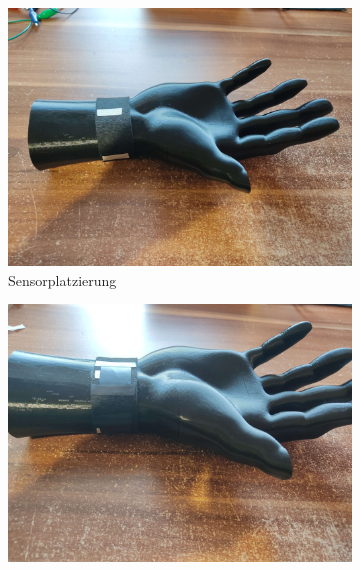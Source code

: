 \documentclass[11pt, a4paper]{article}
\begin{document}
\begin{figure}[h]
	\begin{subfigure}[c]{0.33\textwidth}
		\includegraphics[scale=.037]{assets/Strap_fitting_wires.jpg}
		\caption{Sensorplatzierung}
		\label{fig:Initial_drawing1}
	\end{subfigure}
	\begin{subfigure}[c]{0.33\textwidth}
		\includegraphics[scale=.037]{assets/Strap_fitting_sensors.jpg}
		\label{fig:Initial_drawing2}
	\end{subfigure}
		\begin{subfigure}[c]{0.31\textwidth}

\end{subfigure}
\end{figure}
\end{document}

